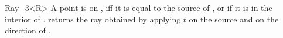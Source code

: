 \begin{ccRefClass} {Ray_3<R>}
       {A point is on \ccVar, iff it is equal to the source 
        of \ccVar, or if it is in the interior of \ccVar.}
% 
% 
       {returns the ray obtained by applying $t$ on the source 
        and on the direction of \ccVar.}

\end{ccRefClass} 
